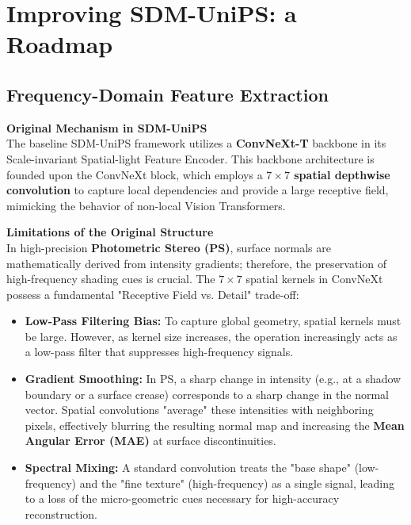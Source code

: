\documentclass[Main.tex]{subfiles}
\begin{document}
\chapter{Improving SDM-UniPS: a Roadmap}
\section{Frequency-Domain Feature Extraction}

\textbf{Original Mechanism in SDM-UniPS} \\
The baseline SDM-UniPS framework utilizes a \textbf{ConvNeXt-T} backbone in its Scale-invariant Spatial-light Feature Encoder. This backbone architecture is founded upon the ConvNeXt block, which employs a \textbf{$7 \times 7$ spatial depthwise convolution} to capture local dependencies and provide a large receptive field, mimicking the behavior of non-local Vision Transformers.

\textbf{Limitations of the Original Structure} \\
In high-precision \textbf{Photometric Stereo (PS)}, surface normals are mathematically derived from intensity gradients; therefore, the preservation of high-frequency shading cues is crucial. The $7 \times 7$ spatial kernels in ConvNeXt possess a fundamental "Receptive Field vs. Detail" trade-off:
\begin{itemize}
    \item \textbf{Low-Pass Filtering Bias:} To capture global geometry, spatial kernels must be large. However, as kernel size increases, the operation increasingly acts as a low-pass filter that suppresses high-frequency signals.
    \item \textbf{Gradient Smoothing:} In PS, a sharp change in intensity (e.g., at a shadow boundary or a surface crease) corresponds to a sharp change in the normal vector. Spatial convolutions "average" these intensities with neighboring pixels, effectively blurring the resulting normal map and increasing the \textbf{Mean Angular Error (MAE)} at surface discontinuities.
    \item \textbf{Spectral Mixing:} A standard convolution treats the "base shape" (low-frequency) and the "fine texture" (high-frequency) as a single signal, leading to a loss of the micro-geometric cues necessary for high-accuracy reconstruction.
\end{itemize}
\end{document}
